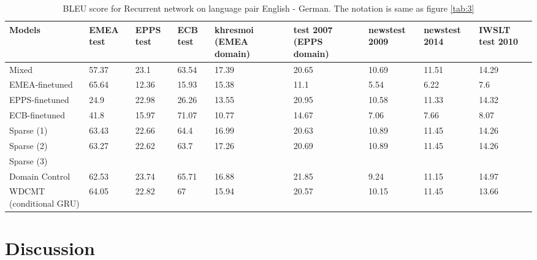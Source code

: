 \documentclass[11pt,a4paper]{article}
\begin{document}
\begin{table}
\begin{center}
 \begin{tabularx}{\textwidth}{|| X | X | X | X | X | X | X | X | X ||} 
 \hline
 Models & EMEA test & EPPS test & ECB test & khresmoi (EMEA domain) & test 2007 (EPPS domain) & newstest 2009 & newstest 2014 & IWSLT test 2010 \\ [0.5ex] 
 \hline\hline
 Mixed & 57.37 & 23.1 & 63.54 & 17.39 & 20.65 & 10.69 & 11.51 & 14.29 \\
 \hline
 EMEA-finetuned & 65.64 & 12.36 & 15.93 & 15.38 & 11.1 & 5.54 & 6.22 & 7.6 \\
 \hline
 EPPS-finetuned & 24.9 & 22.98 & 26.26 & 13.55 & 20.95 & 10.58 & 11.33 & 14.32 \\
 \hline
 ECB-finetuned & 41.8 & 15.97 & 71.07 & 10.77 & 14.67 & 7.06 & 7.66 & 8.07 \\
 \hline
 Sparse (1) & 63.43 & 22.66 & 64.4 & 16.99 & 20.63 & 10.89 & 11.45 & 14.26 \\
 \hline
 Sparse (2) & 63.27 & 22.62 & 63.7 & 17.26 & 20.69 & 10.89 & 11.45 & 14.26 \\
 \hline
 Sparse (3) &  &  &  &  &  &  &  & \\
 \hline
 Domain Control & 62.53 & 23.74 & 65.71 & 16.88 & 21.85 & 9.24 & 11.15 & 14.97 \\
 \hline
 WDCMT (conditional GRU) & 64.05 & 22.82 & 67 & 15.94 & 20.57 & 10.15 & 11.45 & 13.66 \\
 \hline 
\end{tabularx}
\end{center}
\caption{BLEU score for Recurrent network on language pair English - German. The notation is same as figure \ref{tab:3}}
\label{tab:4}
\end{table}

\section{Discussion\label{sec:Discussion}}
\end{document}
